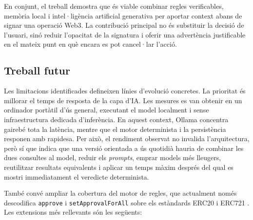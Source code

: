 En conjunt, el treball demostra que és viable combinar regles verificables, memòria local i intel·ligència artificial generativa per aportar context abans de signar una operació Web3. La contribució principal no és substituir la decisió de l'usuari, sinó reduir l'opacitat de la signatura i oferir una advertència justificable en el mateix punt en què encara es pot cancel·lar l'acció.

\subsection{Treball futur}

Les limitacions identificades defineixen línies d'evolució concretes. La prioritat és millorar el temps de resposta de la capa d'IA. Les mesures es van obtenir en un ordinador portàtil d'ús general, executant el model localment i sense infraestructura dedicada d'inferència. En aquest context, Ollama concentra gairebé tota la latència, mentre que el motor determinista i la persistència responen amb rapidesa. Per això, el rendiment observat no invalida l'arquitectura, però sí que indica que una versió orientada a ús quotidià hauria de combinar les dues consultes al model, reduir els \textit{prompts}, emprar models més lleugers, reutilitzar resultats equivalents i aplicar un temps màxim després del qual es mostri immediatament el veredicte determinista.

També convé ampliar la cobertura del motor de regles, que actualment només descodifica \texttt{approve} i \texttt{setApprovalForAll} sobre els estàndards ERC20 \cite{eip20} i ERC721 \cite{eip721}. Les extensions més rellevants són les següents:

